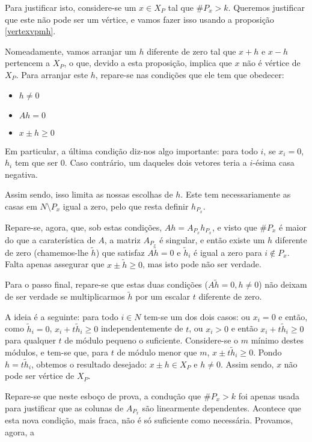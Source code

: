 \documentclass{article}
\theoremstyle{definition}
\begin{document}
	Para justificar isto, considere-se um $x \in X_P$ tal que $\# P_x > k$. Queremos justificar que este não pode ser um vértice, e vamos fazer isso usando a proposição \ref{vertexvpmh}.
	
	Nomeadamente, vamos arranjar um $h$ diferente de zero tal que $x+h$ e $x-h$ pertencem a $X_P$, o que, devido a esta proposição, implica que $x$ não é vértice de $X_P$. Para arranjar este $h$, repare-se nas condições que ele tem que obedecer:
	
	\begin{itemize}
	\item $h \neq 0$
	\item $Ah = 0$
	\item $x \pm h \geq 0$
	\end{itemize}
	
	Em particular, a última condição diz-nos algo importante: para todo $i$, se $x_i = 0$, $h_i$ tem que ser $0$. Caso contrário, um daqueles dois vetores teria a $i$-ésima casa negativa.
	
	Assim sendo, isso limita as nossas escolhas de $h$. Este tem necessariamente as casas em $N \setminus P_x$ igual a zero, pelo que resta definir $h_{P_x}$.
	
	Repare-se, agora, que, sob estas condições, $Ah = A_{P_x} h_{P_x}$, e visto que $\# P_x$ é maior do que a caraterística de $A$, a matriz $A_{P_x}$ é singular, e então existe um $h$ diferente de zero (chamemos-lhe $\tilde h$) que satisfaz $A \tilde h = 0$ e $\tilde h_i$ é igual a zero para $i \not \in P_x$. Falta apenas assegurar que $x \pm \tilde h \geq 0$, mas isto pode não ser verdade.
	
	Para o passo final, repare-se que estas duas condições ($A \tilde h = 0, h \neq 0$) não deixam de ser verdade se multiplicarmos $\tilde h$ por um escalar $t$ diferente de zero.
	
	A ideia é a seguinte: para todo $i \in N$ tem-se um dos dois casos: ou $x_i = 0$ e então, como $\tilde h_i = 0$, $x_i + t \tilde h_i \geq 0$ independentemente de $t$, ou $x_i > 0$ e então $x_i + t \tilde h_i \geq 0$ para qualquer $t$ de módulo pequeno o suficiente. Considere-se o $m$ mínimo destes módulos, e tem-se que, para $t$ de módulo menor que $m$, $x \pm t \tilde h_i \geq 0$. Pondo $h = t \tilde h_i$, obtemos o resultado desejado: $x \pm h \in X_P$ e $h \neq 0$. Assim sendo, $x$ não pode ser vértice de $X_P$.
	
	Repare-se que neste esboço de prova, a condução que $\#P_x > k$ foi apenas usada para justificar que as colunas de $A_{P_x}$ são linearmente dependentes. Acontece que esta nova condição, mais fraca, não é só suficiente como necessária. Provamos, agora, a
	
\end{document}
